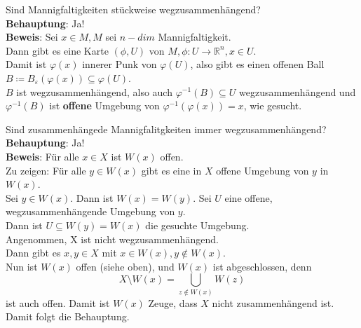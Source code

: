 \begin{problem*}[4a]
Sind Mannigfaltigkeiten stückweise wegzusammenhängend?\\
\textbf{Behauptung}: Ja! \\
\textbf{Beweis}: Sei $ x \in M, M $ sei $ n-dim $ Mannigfaltigkeit. \\
Dann gibt es eine Karte $(\phi, U) $ von $ M, \phi: U \to  \mathbb{R}^n, x \in U$.\\
Damit ist $ \varphi(x) $ innerer Punk von $ \varphi(U)$, also gibt es einen offenen Ball \\ $B \coloneqq B_\varepsilon(\varphi(x)) \subseteq \varphi(U)$.\\
$ B $ ist wegzusammenhängend, also auch $\varphi^{-1}(B) \subseteq U$ wegzusammenhängend und $\varphi^{-1}(B)$ ist \textbf{offene} Umgebung von $\varphi^{-1}(\varphi(x)) = x$, wie gesucht.
\end{problem*}

\begin{problem*}[4b]
Sind zusammenhängede Mannigfalitgkeiten immer wegzusammenhängend?\\
\textbf{Behauptung}: Ja!\\
\textbf{Beweis}: Für alle $ x \in X$ ist $ W(x) $ offen.\\
Zu zeigen: Für alle $ y \in W(x)$ gibt es eine in $ X $ offene Umgebung von $ y $ in $ W(x) $.\\
Sei $ y \in W(x)$. Dann ist $ W(x) = W(y)$. Sei $ U $ eine offene, wegzusammenhängende Umgebung von $ y $.\\
Dann ist $ U \subseteq W(y) = W(x)$ die gesuchte Umgebung.\\
Angenommen, X ist nicht wegzusammenhängend.\\
Dann gibt es $ x,y \in X $ mit $x \in W(x), y \notin W(x)$. \\
Nun ist $W(x)$ offen (siehe oben), und $ W(x) $ ist abgeschlossen, denn
\begin{equation*}
	X \setminus W(x) = \bigcup_{ z \notin W(x)} W(z)
\end{equation*}
ist auch offen. Damit ist $ W(x) $ Zeuge, dass $ X $ nicht zusammenhängend ist. Damit folgt die Behauptung.\\
\end{problem*}


\newpage
